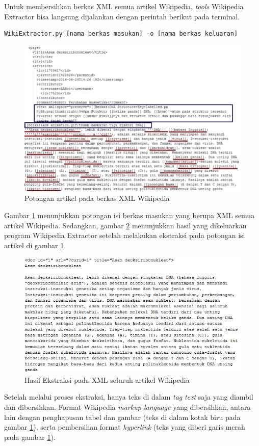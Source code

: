 Untuk membersihkan berkas XML semua artikel Wikipedia, \textit{tools} Wikipedia Extractor bisa langsung dijalankan dengan perintah berikut pada terminal.

\begin{lstlisting}
WikiExtractor.py [nama berkas masukan] -o [nama berkas keluaran]
\end{lstlisting}

\begin{figure}
	\centering
	\includegraphics[width=1\linewidth]{pics/wiki-XML-2}
	\caption{Potongan artikel pada berkas XML Wikipedia}
	\label{fig:wiki-XML}
\end{figure}
Gambar \ref{fig:wiki-XML} menunjukkan potongan isi berkas masukan yang berupa XML semua artikel Wikipedia. Sedangkan, gambar \ref{fig:hasil-ekstraksi} menunjukkan hasil yang dikeluarkan program Wikipedia Extractor setelah melakukan ekstraksi pada potongan isi artikel di gambar \ref{fig:wiki-XML}.
\begin{figure}
	\centering
	\includegraphics[width=1\linewidth]{pics/hasil-ekstraksi}
	\caption{Hasil Ekstraksi pada XML seluruh artikel Wikipedia}
	\label{fig:hasil-ekstraksi}
\end{figure}
\noindent Setelah melalui proses ekstraksi, hanya teks di dalam \textit{tag} \textit{text} saja yang diambil dan dibersihkan. Format Wikipedia \textit{markup language} yang dibersihkan, antara lain dengan penghapusan tabel dan gambar (teks di dalam kotak biru pada gambar \ref{fig:wiki-XML}), serta pembersihan format \textit{hyperlink} (teks yang diberi garis merah pada gambar \ref{fig:wiki-XML}).


